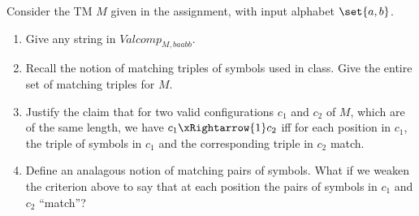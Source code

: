 \documentclass[12pt]{article}
\begin{document}
\begin{problem*}
    Consider the TM $M$ given in the assignment, with input alphabet
    $\set{a, b}$.
    \begin{enumerate}[label=(\alph*)]
        \item Give any string in $Valcomp_{M, baabb}$.
        \item Recall the notion of matching triples of symbols used in class.
        Give the entire set of matching triples for $M$.
        \item Justify the claim that for two valid configurations $c_1$ and
        $c_2$ of $M$, which are of the same length,
        we have $c_1 \xRightarrow{1} c_2$ iff for each position in $c_1$,
        the triple of symbols in $c_1$ and the corresponding triple in $c_2$
        match.
        \item Define an analagous notion of matching pairs of symbols.
        What if we weaken the criterion above to say that at each position
        the pairs of symbols in $c_1$ and $c_2$ ``match''?
    \end{enumerate}
\end{problem*}
\end{document}

